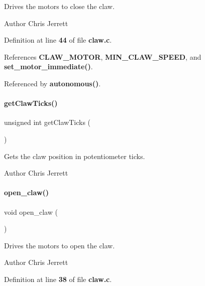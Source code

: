Drives the motors to close the claw. 

\begin{DoxyAuthor}{Author}
Chris Jerrett 
\end{DoxyAuthor}


Definition at line \textbf{ 44} of file \textbf{ claw.\+c}.



References \textbf{ C\+L\+A\+W\+\_\+\+M\+O\+T\+OR}, \textbf{ M\+I\+N\+\_\+\+C\+L\+A\+W\+\_\+\+S\+P\+E\+ED}, and \textbf{ set\+\_\+motor\+\_\+immediate()}.



Referenced by \textbf{ autonomous()}.

\mbox{\label{claw_8h_addd2004effae7c94400aed1fe6a90ead}} 
\paragraph{get\+Claw\+Ticks()}
{\footnotesize\ttfamily unsigned int get\+Claw\+Ticks (\begin{DoxyParamCaption}{ }\end{DoxyParamCaption})}



Gets the claw position in potentiometer ticks. 

\begin{DoxyAuthor}{Author}
Chris Jerrett 
\end{DoxyAuthor}
\mbox{\label{claw_8h_a03023ca28f671b9fa7bac07782ccd8c1}} 
\paragraph{open\+\_\+claw()}
{\footnotesize\ttfamily void open\+\_\+claw (\begin{DoxyParamCaption}{ }\end{DoxyParamCaption})}



Drives the motors to open the claw. 

\begin{DoxyAuthor}{Author}
Chris Jerrett 
\end{DoxyAuthor}


Definition at line \textbf{ 38} of file \textbf{ claw.\+c}.



